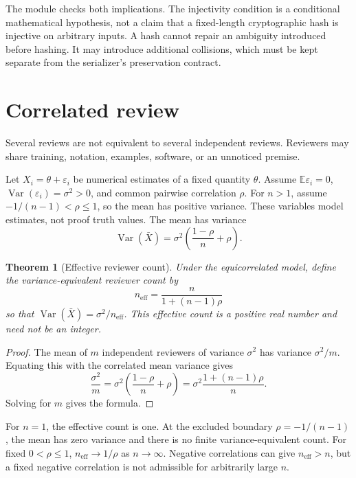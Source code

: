 \documentclass[11pt,oneside]{article}
\theoremstyle{komorebiplain}
\newtheorem{theorem}{Theorem}[section]
\theoremstyle{komorebidefinition}
\theoremstyle{komorebiremark}
\begin{document}
The module  checks both implications. The injectivity condition is a conditional mathematical hypothesis, not a claim that a fixed-length cryptographic hash is injective on arbitrary inputs. A hash cannot repair an ambiguity introduced before hashing. It may introduce additional collisions, which must be kept separate from the serializer's preservation contract.

\section{Correlated review}
\label{sec:old17}
\label{sec:correlated-review}

Several reviews are not equivalent to several independent reviews. Reviewers may share training, notation, examples, software, or an unnoticed premise.

Let $X_i=\theta+\varepsilon_i$ be numerical estimates of a fixed quantity $\theta$. Assume $\mathbb E\varepsilon_i=0$, $\operatorname{Var}(\varepsilon_i)=\sigma^2>0$, and common pairwise correlation $\rho$. For $n>1$, assume $-1/(n-1)<\rho\leq1$, so the mean has positive variance. These variables model estimates, not proof truth values. The mean has variance
\[
\operatorname{Var}(\bar X)
=
\sigma^2\left(\frac{1-\rho}{n}+\rho\right).
\]

\begin{theorem}[Effective reviewer count]
\label{res:17:1}
\label{thm:review-count}
Under the equicorrelated model, define the variance-equivalent reviewer count by
\[
\boxed{
 n_{\mathrm{eff}}
 =
 \frac{n}{1+(n-1)\rho}
}
\]
so that $\operatorname{Var}(\bar X)=\sigma^2/n_{\mathrm{eff}}$. This effective count is a positive real number and need not be an integer.
\end{theorem}

\begin{proof}
The mean of $m$ independent reviewers of variance $\sigma^2$ has variance $\sigma^2/m$. Equating this with the correlated mean variance gives
\[
\frac{\sigma^2}{m}
=
\sigma^2\left(\frac{1-\rho}{n}+\rho\right)
=
\sigma^2\frac{1+(n-1)\rho}{n}.
\]
Solving for $m$ gives the formula.
\end{proof}

For $n=1$, the effective count is one. At the excluded boundary $\rho=-1/(n-1)$, the mean has zero variance and there is no finite variance-equivalent count. For fixed $0<\rho\leq1$, $n_{\mathrm{eff}}\to1/\rho$ as $n\to\infty$. Negative correlations can give $n_{\mathrm{eff}}>n$, but a fixed negative correlation is not admissible for arbitrarily large $n$.
\end{document}
